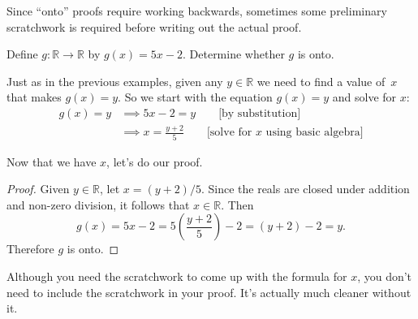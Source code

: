 % 
%

Since ``onto'' proofs require working backwards, sometimes some preliminary scratchwork is required before writing out the actual proof.

\begin{example}{}
Define $g \colon \mathbb{R} \to \mathbb{R}$ by $g(x) = 5x - 2$. Determine whether $g$ is onto.


\begin{scratchwork}
Just as in the previous examples, given any $y \in \mathbb{R}$  we need to find a value of~$x$ that makes $g(x) = y$. So we start with the equation $g(x) = y$ and solve for $x$:
\begin{align*}
g(x) = y  &\implies 5x-2 = y \qquad \text{[by substitution]}\\
 & \implies x = \frac{y+2}{5}\qquad \text{[solve for $x$ using basic algebra]}
\end{align*}

\noindent
Now that we have $x$, let's do our proof.
\end{scratchwork}

\begin{proof} 
Given $y \in \mathbb{R}$, let $x = (y+2)/5$.  Since the reals are closed under addition and non-zero division, it follows that $x \in \mathbb{R}$. Then
\[ g(x) = 5x - 2 = 5 \left( \frac{y+2}{5} \right) - 2 = (y+2) - 2 = y . \]
Therefore $g$ is onto.
\end{proof}

\medskip
Although you need the scratchwork to come up with the formula for $x$, you don't need to include the scratchwork in your proof. It's actually much cleaner without it.
\end{example}

